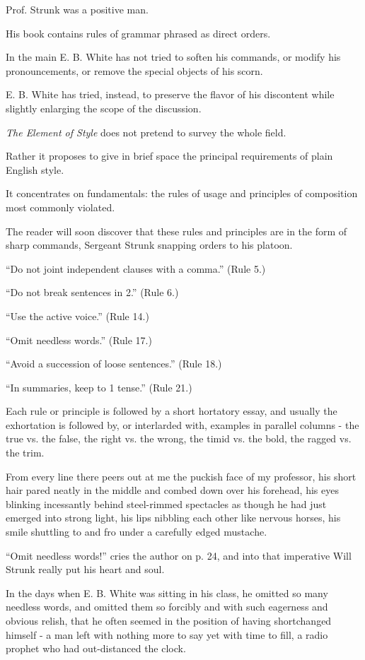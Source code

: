 \documentclass{article}
\begin{document}
%
Prof. Strunk was a positive man.

His book contains rules of grammar phrased as direct orders.

In the main E. B. White has not tried to soften his commands, or modify his pronouncements, or remove the special objects of his scorn.

E. B. White has tried, instead, to preserve the flavor of his discontent while slightly enlarging the scope of the discussion.

{\it The Element of Style} does not pretend to survey the whole field.

Rather it proposes to give in brief space the principal requirements of plain English style.

It concentrates on fundamentals: the rules of usage and principles of composition most commonly violated.

%
The reader will soon discover that these rules and principles are in the form of sharp commands, Sergeant Strunk snapping orders to his platoon.

``Do not joint independent clauses with a comma.'' (Rule 5.)

``Do not break sentences in 2.'' (Rule 6.)

``Use the active voice.'' (Rule 14.)

``Omit needless words.'' (Rule 17.)

``Avoid a succession of loose sentences.'' (Rule 18.)

``In summaries, keep to 1 tense.'' (Rule 21.)

Each rule or principle is followed by a short hortatory essay, and usually the exhortation is followed by, or interlarded with, examples in parallel columns - the true vs. the false, the right vs. the wrong, the timid vs. the bold, the ragged vs. the trim.

From every line there peers out at me the puckish face of my professor, his short hair pared neatly in the middle and combed down over his forehead, his eyes blinking incessantly behind steel-rimmed spectacles as though he had just emerged into strong light, his lips nibbling each other like nervous horses, his smile shuttling to and fro under a carefully edged mustache.

%
``Omit needless words!'' cries the author on p. 24, and into that imperative Will Strunk really put his heart and soul.

In the days when E. B. White was sitting in his class, he omitted so many needless words, and omitted them so forcibly and with such eagerness and obvious relish, that he often seemed in the position of having shortchanged himself - a man left with nothing more to say yet with time to fill, a radio prophet who had out-distanced the clock.
\end{document}
